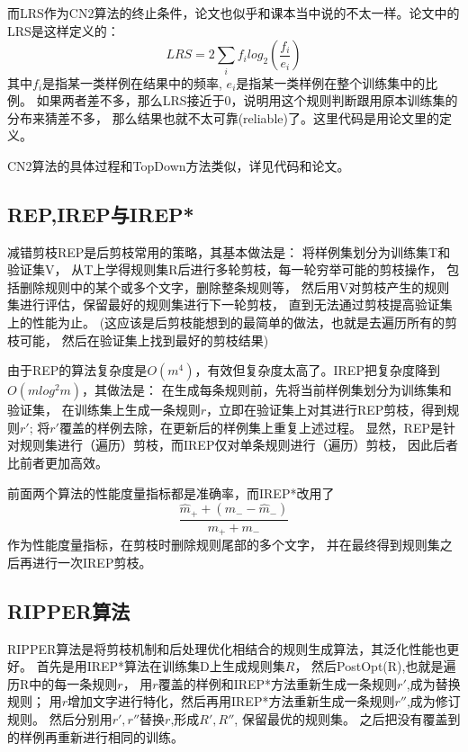 \documentclass[UTF8]{article}
\begin{document}
    而LRS作为CN2算法的终止条件，论文也似乎和课本当中说的不太一样。论文中的LRS是这样定义的：
    \begin{equation}\label{LRS_in_CN2}
        LRS = 2\sum_i f_i log_2(\dfrac{f_i}{e_i})
    \end{equation}
    其中$f_i$是指某一类样例在结果中的频率, $e_i$是指某一类样例在整个训练集中的比例。
    如果两者差不多，那么LRS接近于0，说明用这个规则判断跟用原本训练集的分布来猜差不多，
    那么结果也就不太可靠(reliable)了。这里代码是用论文里的定义。

    CN2算法的具体过程和TopDown方法类似，详见代码和论文。

\subsection{REP,IREP与IREP*}
    减错剪枝REP是后剪枝常用的策略，其基本做法是：
    将样例集划分为训练集T和验证集V，
    从T上学得规则集R后进行多轮剪枝，每一轮穷举可能的剪枝操作，
    包括删除规则中的某个或多个文字，删除整条规则等，
    然后用V对剪枝产生的规则集进行评估，保留最好的规则集进行下一轮剪枝，
    直到无法通过剪枝提高验证集上的性能为止。
    (这应该是后剪枝能想到的最简单的做法，也就是去遍历所有的剪枝可能，
    然后在验证集上找到最好的剪枝结果)

    由于REP的算法复杂度是$O(m^4)$，有效但复杂度太高了。IREP把复杂度降到$O(mlog^2m)$，其做法是：
    在生成每条规则前，先将当前样例集划分为训练集和验证集，
    在训练集上生成一条规则$r$，立即在验证集上对其进行REP剪枝，得到规则$r'$;
    将$r'$覆盖的样例去除，在更新后的样例集上重复上述过程。
    显然，REP是针对规则集进行（遍历）剪枝，而IREP仅对单条规则进行（遍历）剪枝，
    因此后者比前者更加高效。

    前面两个算法的性能度量指标都是准确率，而IREP*改用了
    $$\dfrac{\hat{m}_++(m_--\hat{m}_-)}{m_++m_-}$$
    作为性能度量指标，在剪枝时删除规则尾部的多个文字，
    并在最终得到规则集之后再进行一次IREP剪枝。

\subsection{RIPPER算法}
    RIPPER算法是将剪枝机制和后处理优化相结合的规则生成算法，其泛化性能也更好。
    首先是用IREP*算法在训练集D上生成规则集$R$，
    然后PostOpt(R),也就是遍历R中的每一条规则$r$，
    用$r$覆盖的样例和IREP*方法重新生成一条规则$r'$,成为替换规则；
    用$r$增加文字进行特化，然后再用IREP*方法重新生成一条规则$r''$,成为修订规则。
    然后分别用$r',r''$替换$r$,形成$R',R''$, 保留最优的规则集。
    之后把没有覆盖到的样例再重新进行相同的训练。
\end{document}
